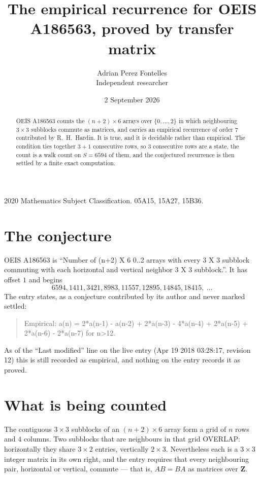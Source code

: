 \documentclass[11pt,a4paper]{article}
\title{The empirical recurrence for OEIS A186563, proved by transfer matrix}
\author{Adrian Perez Fontelles\\ \small Independent researcher}
\date{2 September 2026}
\theoremstyle{plain}
\theoremstyle{definition}
\begin{document}
\maketitle

\begin{abstract}
OEIS A186563 counts the $(n+2)\times6$ arrays over $\{0,\dots,2\}$ in which
neighbouring $3\times3$ subblocks commute as matrices, and carries an empirical
recurrence
of order $7$ contributed by R.~H.~Hardin. It is true, and it is decidable rather than
empirical. The condition ties together $3+1$ consecutive rows, so $3$ consecutive rows are
a state, the count is a walk count on $S=6594$ of them, and the conjectured recurrence is then
settled by a finite exact computation.
\end{abstract}

\noindent\small 2020 Mathematics Subject Classification. 05A15, 15A27, 15B36.\normalsize

\section{The conjecture}

OEIS A186563 is ``Number of (n+2) X 6 0..2 arrays with every 3 X 3 subblock commuting with each horizontal and vertical neighbor 3 X 3 subblock.''. It has offset $1$ and begins
\[
6594, 1411, 3421, 8983, 11557, 12895, 14845, 18415,\ \dots
\]
The entry states, as a conjecture contributed by its author and never marked settled:
\begin{quote}
Empirical: a(n) = 2*a(n-1) - a(n-2) + 2*a(n-3) - 4*a(n-4) + 2*a(n-5) + 2*a(n-6) - 2*a(n-7) for n>12.
\end{quote}
As of the ``Last modified'' line on the live entry (Apr 19 2018 03:28:17, revision 12) this is still
recorded as empirical, and nothing on the entry records it as proved.

\section{What is being counted}

The contiguous $3\times3$ subblocks of an $(n+2)\times6$ array form a grid of $n$
rows and $4$ columns. Two subblocks that are neighbours in that
grid OVERLAP: horizontally they share $3\times2$ entries, vertically
$2\times3$. Nevertheless each is a $3\times3$ integer matrix in its own right, and
the entry requires that every neighbouring pair, horizontal or vertical, commute --- that is,
$AB=BA$ as matrices over $\mathbf{Z}$.
\end{document}

